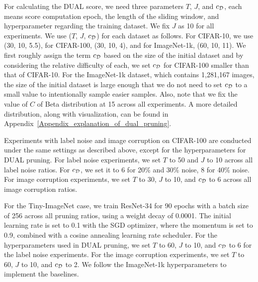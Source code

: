 For calculating the DUAL score, we need three parameters $T$, $J$, and $c_{\mathcal{D}}$, each means score computation epoch, the length of the sliding window, and hyperparameter regarding the training dataset. We fix $J$ as 10 for all experiments.
We use ($T$, $J$, $c_{\mathcal{D}}$) for each dataset as follows. For CIFAR-10, we use (30, 10, 5.5), for CIFAR-100, (30, 10, 4), and for ImageNet-1k, (60, 10, 11).
We first roughly assign the term $c_{\mathcal{D}}$ based on the size of the initial dataset and by considering the relative difficulty of each, we set $c_{\mathcal{D}}$ for CIFAR-100 smaller than that of CIFAR-10. For the ImageNet-1k dataset, which contains 1,281,167 images, the size of the initial dataset is large enough that we do not need to set $c_{\mathcal{D}}$ to a small value to intentionally sample easier samples. Also, note that we fix the value of $C$ of Beta distribution at 15 across all experiments. A more detailed distribution, along with visualization, can be found in Appendix~\ref{Appendix_explanation_of_dual_pruning}.

Experiments with label noise and image corruption on CIFAR-100 are conducted under the same settings as described above, except for the hyperparameters for DUAL pruning. For label noise experiments, we set $T$ to 50 and $J$ to 10 across all label noise ratios. For $c_{\mathcal{D}}$, we set it to 6 for 20\% and 30\% noise, 8 for 40\% noise. For image corruption experiments, we set $T$ to 30, $J$ to 10, and $c_{\mathcal{D}}$ to 6 across all image corruption ratios. 

For the Tiny-ImageNet case, we train ResNet-34 for 90 epochs with a batch size of 256 across all pruning ratios, using a weight decay of 0.0001. The initial learning rate is set to 0.1 with the SGD optimizer, where the momentum is set to 0.9, combined with a cosine annealing learning rate scheduler. For the hyperparameters used in DUAL pruning,  we set $T$ to 60, $J$ to 10, and $c_{\mathcal{D}}$ to 6 for the label noise experiments. For the image corruption experiments, we set $T$ to 60, $J$ to 10, and $c_{\mathcal{D}}$ to 2. We follow the ImageNet-1k hyperparameters to implement the baselines.